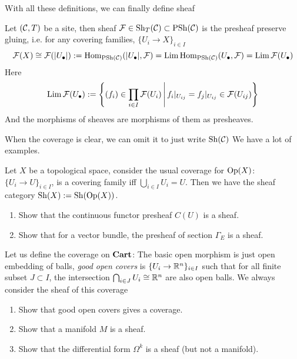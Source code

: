 With all these definitions, we can finally define sheaf
\begin{definition}[Sheaf]
 Let $(\mathcal{C},T)$ be a site, then sheaf $\mathcal{F}\in\mathrm{Sh}_T(\mathcal{C})\subset \mathrm{PSh}(\mathcal{C})$ is the presheaf preserve gluing, i.e. for any covering families, $\{ U_i \to X \}_{i \in I}$
   \[
     \mathcal{F}(X)\cong \mathcal{F}(|U_{\bullet}|) :=\mathrm{Hom}_{\mathrm{PSh}(\mathcal{C})}(|U_{\bullet}|, \mathcal{F})= \operatorname*{\mathrm{Lim}} \mathrm{Hom}_{\mathrm{PSh}(\mathcal{C})}(U_{\bullet},\mathcal{F})=\operatorname*{\mathrm{Lim}} \mathcal{F}(U_{\bullet})
   \] 
  Here \[
    \operatorname*{\mathrm{Lim}} \mathcal{F}(U_{\bullet}) := \left\{ (f_i)\in \prod_{i\in I}\mathcal{F}(U_{i}) \,\middle\vert\, f_i|_{U_{ij}}=f_j|_{U_{ij}}\in \mathcal{F}(U_{ij})\right\}
  \] 
  And the morphisms of sheaves are morphisms of them as presheaves.
\end{definition}
When the coverage is clear, we can omit it to just write $ \mathrm{Sh}(\mathcal{C})$
We have a lot of examples.
\begin{example}
  Let $X$ be a topological space, consider the usual coverage for $\mathrm{Op}(X)$: $\{ U_i \to U \}_{i \in I}$, is a covering family iff $ \bigcup_{i\in I} U_i =U$. Then we have the sheaf category $\mathrm{Sh}(X):= \mathrm{Sh}(\mathrm{Op}(X))$.
  
  \begin{exercise}
   \begin{enumerate}
    \item Show that the continuous functor presheaf $C(U)$ is a sheaf.
    \item Show that for a vector bundle, the presheaf of section $\Gamma_E$ is a sheaf.
   \end{enumerate} 
  \end{exercise}
\end{example}

\begin{example}
  Let us define the coverage on $\mathbf{Cart}$: The basic open morphism is just open embedding of balls, \emph{good open covers} is $\{ U_i \to \mathbb{R}^n \}_{i \in I}$ such that for all finite subset $J\subset I $, the intersection $\bigcap_{i\in J}U_i \cong \mathbb{R}^n$ are also open balls. We always consider the sheaf of this coverage
  \begin{exercise}
   \begin{enumerate}
    \item Show that good open covers gives a coverage. 
    \item Show that a manifold $M$ is a sheaf.
    \item Show that the differential form $\Omega^k$ is a sheaf (but not a manifold).
   \end{enumerate} 
  \end{exercise}
\end{example}

